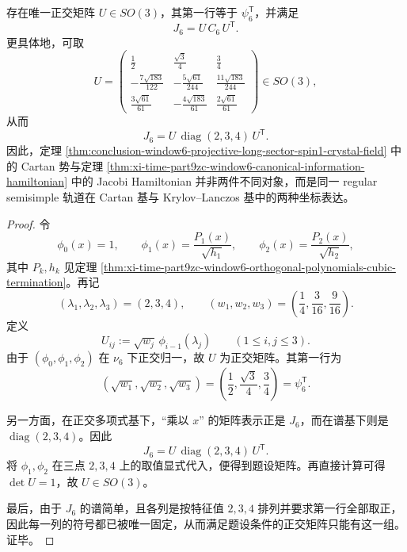 \begin{theorem}\label{thm:xi-time-part9zc-window6-cartan-lanczos-conjugacy}
存在唯一正交矩阵 \(U\in SO(3)\)，其第一行等于 \(\psi_6^{\mathsf T}\)，并满足
\[
J_6=U\,C_6\,U^{\mathsf T}.
\]
更具体地，可取
\[
U=
\begin{pmatrix}
\frac12 & \frac{\sqrt3}{4} & \frac34\\[1mm]
-\frac{7\sqrt{183}}{122} & -\frac{5\sqrt{61}}{244} & \frac{11\sqrt{183}}{244}\\[1mm]
\frac{3\sqrt{61}}{61} & -\frac{4\sqrt{183}}{61} & \frac{2\sqrt{61}}{61}
\end{pmatrix}\in SO(3),
\]
从而
\[
J_6=U\,\operatorname{diag}(2,3,4)\,U^{\mathsf T}.
\]
因此，定理 \ref{thm:conclusion-window6-projective-long-sector-spin1-crystal-field} 中的 Cartan 势与定理 \ref{thm:xi-time-part9zc-window6-canonical-information-hamiltonian} 中的 Jacobi Hamiltonian 并非两件不同对象，而是同一 regular semisimple 轨道在 Cartan 基与 Krylov--Lanczos 基中的两种坐标表达。
\end{theorem}
\begin{proof}
令
\[
\phi_0(x)=1,
\qquad
\phi_1(x)=\frac{P_1(x)}{\sqrt{h_1}},
\qquad
\phi_2(x)=\frac{P_2(x)}{\sqrt{h_2}},
\]
其中 \(P_k,h_k\) 见定理 \ref{thm:xi-time-part9zc-window6-orthogonal-polynomials-cubic-termination}。再记
\[
(\lambda_1,\lambda_2,\lambda_3)=(2,3,4),
\qquad
(w_1,w_2,w_3)=\left(\frac14,\frac3{16},\frac9{16}\right).
\]
定义
\[
U_{ij}:=\sqrt{w_j}\,\phi_{i-1}(\lambda_j)
\qquad (1\le i,j\le 3).
\]
由于 \((\phi_0,\phi_1,\phi_2)\) 在 \(\nu_6\) 下正交归一，故 \(U\) 为正交矩阵。其第一行为
\[
(\sqrt{w_1},\sqrt{w_2},\sqrt{w_3})
=
\left(\frac12,\frac{\sqrt3}{4},\frac34\right)
=
\psi_6^{\mathsf T}.
\]

另一方面，在正交多项式基下，“乘以 \(x\)” 的矩阵表示正是 \(J_6\)，而在谱基下则是 \(\operatorname{diag}(2,3,4)\)。因此
\[
J_6=U\,\operatorname{diag}(2,3,4)\,U^{\mathsf T}.
\]
将 \(\phi_1,\phi_2\) 在三点 \(2,3,4\) 上的取值显式代入，便得到题设矩阵。再直接计算可得 \(\det U=1\)，故 \(U\in SO(3)\)。

最后，由于 \(J_6\) 的谱简单，且各列是按特征值 \(2,3,4\) 排列并要求第一行全部取正，因此每一列的符号都已被唯一固定，从而满足题设条件的正交矩阵只能有这一组。证毕。
\end{proof}

